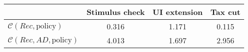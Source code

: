 \begin{tabular}{@{}lccc@{}} 
\toprule 
                          & Stimulus check      & UI extension    & Tax cut    \\  \midrule 
$\mathcal{C}(Rec,\text{policy})$ & 0.316  & 1.171  & 0.115     \\ 
$\mathcal{C}(Rec, AD,\text{policy})$ & 4.013  & 1.697  & 2.956     \\ 
\end{tabular}  
